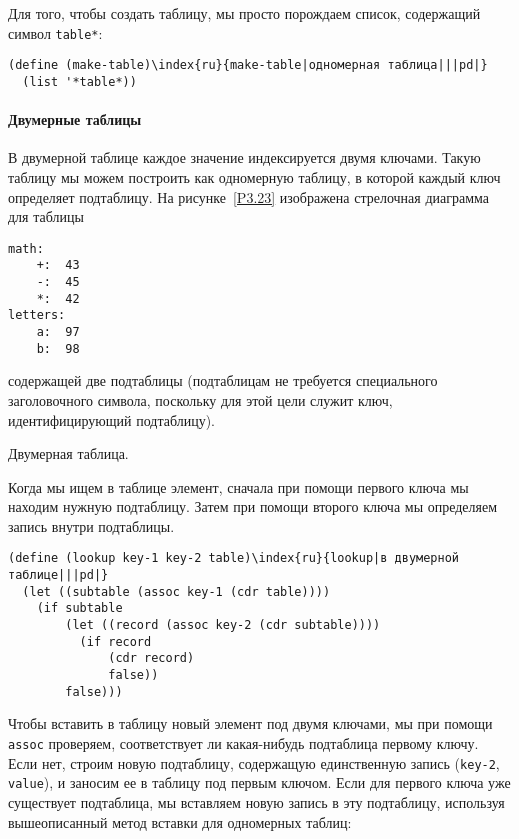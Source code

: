Для того, чтобы создать таблицу, мы просто порождаем
список, содержащий символ {\tt *table*}:

\begin{Verbatim}[fontsize=\small]
(define (make-table)\index{ru}{make-table|одномерная таблица|||pd|}
  (list '*table*))
\end{Verbatim}

\paragraph{Двумерные таблицы}

В двумерной таблице каждое значение индексируется двумя
ключами.  Такую таблицу мы можем построить как одномерную таблицу, в
которой каждый ключ определяет подтаблицу.  На
рисунке~\ref{P3.23} изображена стрелочная диаграмма для таблицы

\begin{Verbatim}[fontsize=\small]
math:
    +:  43
    -:  45
    *:  42
letters:
    a:  97
    b:  98
\end{Verbatim}
содержащей две подтаблицы (подтаблицам не требуется специального
заголовочного символа, поскольку для этой цели служит ключ,
идентифицирующий подтаблицу).


\begin{cntrfig}

\caption{Двумерная таблица.}
\label{P3.23}

\end{cntrfig}

Когда мы ищем в таблице элемент, сначала при помощи
первого ключа мы находим нужную подтаблицу. Затем при помощи второго
ключа мы определяем запись внутри подтаблицы.

\begin{Verbatim}[fontsize=\small]
(define (lookup key-1 key-2 table)\index{ru}{lookup|в двумерной таблице|||pd|}
  (let ((subtable (assoc key-1 (cdr table))))
    (if subtable
        (let ((record (assoc key-2 (cdr subtable))))
          (if record
              (cdr record)
              false))
        false)))
\end{Verbatim}

Чтобы вставить в таблицу новый элемент под двумя ключами,
мы при помощи {\tt assoc} проверяем, соответствует ли
какая-нибудь подтаблица первому ключу.  Если нет, строим новую
подтаблицу, содержащую единственную запись
({\tt key-2}, {\tt value}), и заносим
ее в таблицу под первым ключом.  Если для первого ключа уже существует
подтаблица, мы вставляем новую запись в эту подтаблицу, используя
вышеописанный метод вставки для одномерных таблиц:

